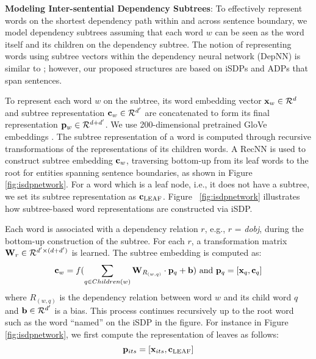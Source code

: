 \documentclass[letterpaper]{article} \usepackage{aaai19}  \usepackage{times}  \usepackage{helvet}  \usepackage{courier}  \usepackage{url}  \usepackage{graphicx}
\def\dnrm#1{\mbox{$_{\hbox{\scriptsize #1}}$}}
\begin{document}
{\bf Modeling Inter-sentential Dependency Subtrees}: 
To effectively represent words on the shortest dependency path within and across sentence boundary, 
we model dependency subtrees assuming that
each word $w$ can be seen as the word itself and its
children on the dependency subtree. The notion of
representing words using subtree vectors within the
dependency neural network  (DepNN) is similar to
\cite{liu2015dependency}; 
however, 
our proposed structures are based on iSDPs and ADPs that span sentences. 


To represent each word $w$ on the subtree, its word
embedding vector ${\bf x}_w \in {\cal R}^{d}$ and subtree
representation ${\bf c}_w \in {\cal R}^{d'}$ are
concatenated to form its final representation ${\bf p}_w \in
{\cal R}^{d+d'}$.  We use 
200-dimensional pretrained
GloVe embeddings \cite{pennington2014glove}.
The subtree representation of a word is
computed through recursive transformations of the
representations of its children words.  A RecNN
is used to construct subtree embedding ${\bf c}_w$,
traversing bottom-up from its leaf words to the root for
entities spanning sentence boundaries, as shown in
Figure \ref{fig:isdpnetwork}.  For a word which is a leaf
node, i.e., it does not have a subtree, we set its subtree
representation as ${\bf c}\dnrm{LEAF}$.
Figure
~\ref{fig:isdpnetwork} illustrates how 
subtree-based word
representations are constructed via iSDP.





Each word is associated with a dependency relation $r$,
e.g.,  $r$ = \emph{dobj},
during the bottom-up construction of the subtree. 
For each  $r$, a transformation matrix ${\bf W}_r \in {\cal R}^{d' \times (d+d')}$ 
is  learned. The subtree embedding is computed as:
\small \[
{\bf c}_w = f( \sum_{q \in Children(w)}  {\bf W}_{R_{(w,q)}} \cdot {\bf p}_q + {\bf b})  \ \mbox{and} \  {\bf p}_q  = [{\bf x}_q, {\bf c}_q] 
\]\normalsize
where $R_{(w,q)}$ is the dependency relation between
word $w$ and its child word $q$ and ${\bf b} \in {\cal R}^{d'}$ is a bias.  
This process continues recursively up to the root word such
as the word ``named'' on the iSDP in the figure.
\iffalse
For instance in Figure \ref{fig:isdpnetwork}, we first compute the representation of leaves as follows:
\begin{equation*}
{\bf p}_{its} = [{\bf x}_{its}, {\bf c}\dnrm{LEAF}]
\end{equation*}
\end{document}
